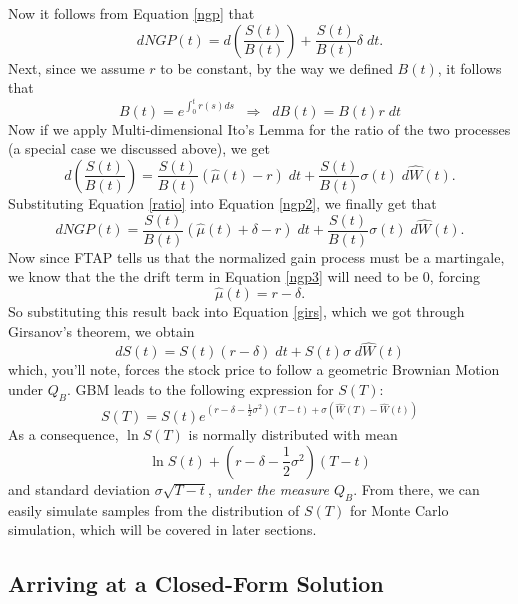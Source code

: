 \documentclass[12pt]{article}
\theoremstyle{plain}
\theoremstyle{definition}
\theoremstyle{remark}
\begin{document}
Now it follows from Equation \ref{ngp} that
\begin{equation}
   \label{ngp2}
   dNGP(t) = d\left(\frac{S(t)}{B(t)}\right) + \frac{S(t)}{B(t)}
      \delta \; dt. 
\end{equation}
Next, since we assume $r$ to be constant, by the way we defined 
$B(t)$, it follows that 
   \[ B(t) = e^{\int^t_0 r(s) ds} \;\; \Rightarrow 
      \;\; dB(t) = B(t)r \;dt\]
Now if we apply Multi-dimensional Ito's Lemma for the ratio of the
two processes (a special case we discussed above), we get
\begin{equation}
   \label{ratio}
   d\left(\frac{S(t)}{B(t)}\right) = \frac{S(t)}{B(t)} 
      \left(\hat{\mu}(t) - r\right) \; dt + \frac{S(t)}{B(t)}\sigma(t)
      \; d\hat{W}(t).
\end{equation}
Substituting Equation \ref{ratio} into Equation \ref{ngp2}, we finally
get that
\begin{equation}
   \label{ngp3}
   dNGP(t) = \frac{S(t)}{B(t)}\left(\hat{\mu}(t) + \delta - r\right)
   \; dt + \frac{S(t)}{B(t)} \sigma(t) \; d\hat{W}(t).
\end{equation}
Now since FTAP tells us that the normalized gain process must be 
a martingale, we know that the the drift term in Equation \ref{ngp3}
will need to be 0, forcing
   \[ \hat{\mu}(t)= r - \delta.\]
So substituting this result back into Equation \ref{girs}, which
we got through Girsanov's theorem, we obtain
   \[ dS(t) = S(t)(r - \delta) \; dt + S(t)\sigma \; d\hat{W}(t)\]
which, you'll note, forces the stock price to follow a geometric
Brownian Motion under $Q_B$. GBM leads to the following expression
for $S(T)$:
   \[ S(T) = S(t) e^{\left(r - \delta -\frac{1}{2}\sigma^2\right)
      (T-t) + \sigma(\hat{W}(T) - \hat{W}(t))} \]
As a consequence, $\ln S(T)$ is normally distributed with mean
   \[ \ln S(t) + \left(r - \delta - \frac{1}{2}\sigma^2\right) (T-t) \]
and standard deviation $\sigma\sqrt{T-t}$, \emph{under the measure 
$Q_B$}.  From there, we can
easily simulate samples from the distribution of $S(T)$ for 
Monte Carlo simulation, which will be covered in later sections.


\newpage

\subsection{Arriving at a Closed-Form Solution}
\end{document}
